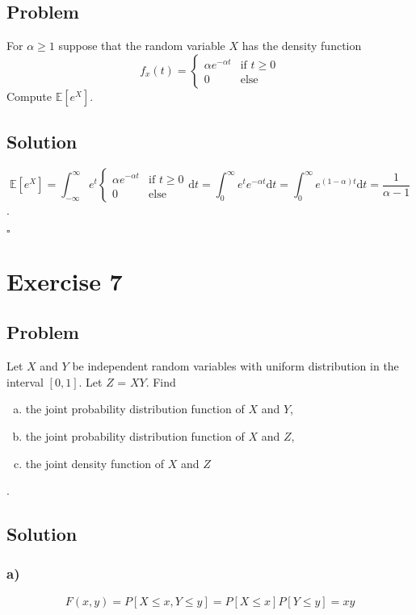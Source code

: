 \documentclass[a4paper,10pt]{article}
\begin{document}
\subsection{Problem}

For $\alpha \geq 1$ suppose that the random variable $X$ has the density function
$$
f_x(t) =
\begin{cases}
  \alpha e^{-\alpha t} & \mbox{if } t \geq 0 \\
  0 & \mbox{else}
\end{cases}
$$ Compute $\mathbb{E}[e^X]$.

\subsection{Solution}

$$
\mathbb{E}[e^X] = \int_{-\infty}^{\infty}{e^t \begin{cases}
  \alpha e^{-\alpha t} & \mbox{if } t \geq 0 \\
  0 & \mbox{else}
\end{cases}\mathrm{d}t}
= \int_{0}^{\infty}{e^t e^{-\alpha t} \mathrm{d}t}
= \int_{0}^{\infty}{e^{(1 - \alpha) t} \mathrm{d}t}
= \frac{1}{\alpha - 1}
$$.

{\raggedleft{}$\square$}

\section{Exercise 7}
\subsection{Problem}

Let $X$ and $Y$ be independent random variables with uniform distribution in the interval $[0, 1]$. Let $Z$ = $XY$. Find
\begin{enumerate}[a)]
  \item the joint probability distribution function of $X$ and $Y$,
  \item the joint probability distribution function of $X$ and $Z$,
  \item the joint density function of $X$ and $Z$
\end{enumerate}.

\subsection{Solution}
\subsubsection{a)}
$$
  F(x, y) = P[X \leq x, Y \leq y] = P[X \leq x]P[Y \leq y] = x y
$$
\end{document}
